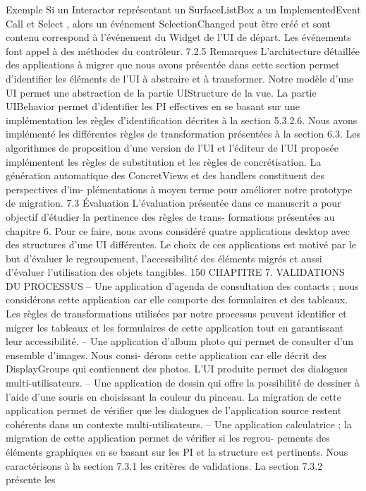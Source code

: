 \documentclass{article}
\begin{document}
Exemple
Si un Interactor représentant un SurfaceListBox a un ImplementedEvent Call et Select ,
alors un événement SelectionChanged peut être créé et sont contenu correspond à l’événement du
Widget de l’UI de départ. Les événements font appel à des méthodes du contrôleur.
7.2.5
Remarques
L’architecture détaillée des applications à migrer que nous avons présentée dans cette section
permet d’identiﬁer les éléments de l’UI à abstraire et à transformer. Notre modèle d’une UI permet
une abstraction de la partie UIStructure de la vue. La partie UIBehavior permet d’identiﬁer les PI
effectives en se basant sur une implémentation les règles d’identiﬁcation décrites à la section 5.3.2.6.
Nous avons implémenté les différentes règles de transformation présentées à la section 6.3. Les
algorithmes de proposition d’une version de l’UI et l’éditeur de l’UI proposée implémentent les règles
de substitution et les règles de concrétisation.
La génération automatique des ConcretViews et des handlers constituent des perspectives d’im-
plémentations à moyen terme pour améliorer notre prototype de migration.
7.3
Évaluation
L’évaluation présentée dans ce manuscrit a pour objectif d’étudier la pertinence des règles de trans-
formations présentées au chapitre 6. Pour ce faire, nous avons considéré quatre applications desktop
avec des structures d’une UI différentes. Le choix de ces applications est motivé par le but d’évaluer le
regroupement, l’accessibilité des éléments migrés et aussi d’évaluer l’utilisation des objets tangibles.
150
CHAPITRE 7. VALIDATIONS DU PROCESSUS
– Une application d’agenda de consultation des contacts ; nous considérons cette application car
elle comporte des formulaires et des tableaux. Les règles de transformations utilisées par notre
processus peuvent identiﬁer et migrer les tableaux et les formulaires de cette application tout
en garantissant leur accessibilité.
– Une application d’album photo qui permet de consulter d’un ensemble d’images. Nous consi-
dérons cette application car elle décrit des DisplayGroups qui contiennent des photos. L’UI
produite permet des dialogues multi-utilisateurs.
– Une application de dessin qui offre la possibilité de dessiner à l’aide d’une souris en choisissant
la couleur du pinceau. La migration de cette application permet de vériﬁer que les dialogues de
l’application source restent cohérents dans un contexte multi-utilisateurs.
– Une application calculatrice ; la migration de cette application permet de vériﬁer si les regrou-
pements des éléments graphiques en se basant sur les PI et la structure est pertinents.
Nous caractérisons à la section 7.3.1 les critères de validations. La section 7.3.2 présente les
\end{document}
